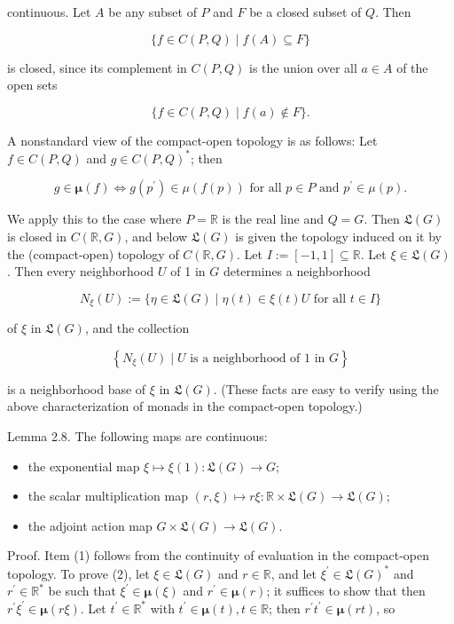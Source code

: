 \documentclass[10pt]{article}
\begin{document}
continuous. Let $A$ be any subset of $P$ and $F$ be a closed subset of $Q$. Then

$$
\{f \in C(P, Q) \mid f(A) \subseteq F\}
$$

is closed, since its complement in $C(P, Q)$ is the union over all $a \in A$ of the open sets

$$
\{f \in C(P, Q) \mid f(a) \notin F\} .
$$

A nonstandard view of the compact-open topology is as follows: Let $f \in C(P, Q)$ and $g \in C(P, Q)^{*}$; then

$$
g \in \boldsymbol{\mu}(f) \Longleftrightarrow g\left(p^{\prime}\right) \in \mu(f(p)) \text { for all } p \in P \text { and } p^{\prime} \in \mu(p) .
$$

We apply this to the case where $P=\mathbb{R}$ is the real line and $Q=G$. Then $\mathfrak{L}(G)$ is closed in $C(\mathbb{R}, G)$, and below $\mathfrak{L}(G)$ is given the topology induced on it by the (compact-open) topology of $C(\mathbb{R}, G)$. Let $I:=[-1,1] \subseteq \mathbb{R}$. Let $\xi \in \mathfrak{L}(G)$. Then every neighborhood $U$ of 1 in $G$ determines a neighborhood

$$
N_{\xi}(U):=\{\eta \in \mathfrak{L}(G) \mid \eta(t) \in \xi(t) U \text { for all } t \in I\}
$$

of $\xi$ in $\mathfrak{L}(G)$, and the collection

$$
\left\{N_{\xi}(U) \mid U \text { is a neighborhood of } 1 \text { in } G\right\}
$$

is a neighborhood base of $\xi$ in $\mathfrak{L}(G)$. (These facts are easy to verify using the above characterization of monads in the compact-open topology.)

Lemma 2.8. The following maps are continuous:

\begin{itemize}
  \item[(1)] the exponential map $\xi \mapsto \xi(1): \mathfrak{L}(G) \rightarrow G$;
  \item[(2)] the scalar multiplication map $(r, \xi) \mapsto r \xi: \mathbb{R} \times \mathfrak{L}(G) \rightarrow \mathfrak{L}(G)$;
  \item[(3)] the adjoint action map $G \times \mathfrak{L}(G) \rightarrow \mathfrak{L}(G)$.
\end{itemize}

Proof. Item (1) follows from the continuity of evaluation in the compact-open topology. To prove (2), let $\xi \in \mathfrak{L}(G)$ and $r \in \mathbb{R}$, and let $\xi^{\prime} \in \mathfrak{L}(G)^{*}$ and $r^{\prime} \in \mathbb{R}^{*}$ be such that $\xi^{\prime} \in \boldsymbol{\mu}(\xi)$ and $r^{\prime} \in \boldsymbol{\mu}(r)$; it suffices to show that then $r^{\prime} \xi^{\prime} \in \boldsymbol{\mu}(r \xi)$. Let $t^{\prime} \in \mathbb{R}^{*}$ with $t^{\prime} \in \boldsymbol{\mu}(t), t \in \mathbb{R}$; then $r^{\prime} t^{\prime} \in \boldsymbol{\mu}(r t)$, so
\end{document}
